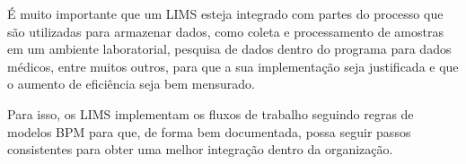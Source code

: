 É muito importante que um LIMS esteja integrado com partes do processo que são utilizadas para armazenar dados, como coleta e processamento de amostras em um ambiente laboratorial, pesquisa de dados dentro do programa para dados médicos, entre muitos outros, para que a sua implementação seja justificada e que o aumento de eficiência seja bem mensurado.

Para isso, os LIMS implementam os fluxos de trabalho seguindo regras de modelos BPM para que, de forma bem documentada, possa seguir passos consistentes para obter uma melhor integração dentro da organização.